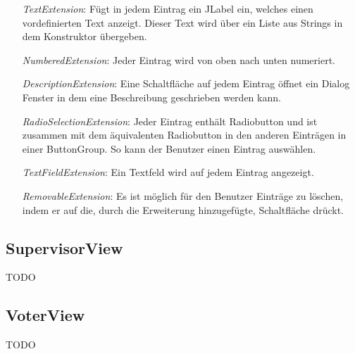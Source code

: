 \documentclass[parskip=full]{scrartcl}
\begin{document}
		\begin{itemize}
			\item[\textit{TextExtension}:] Fügt in jedem Eintrag ein JLabel ein, welches einen vordefinierten Text anzeigt. Dieser Text wird über ein Liste aus Strings in dem Konstruktor übergeben.
			\item[\textit{NumberedExtension}:] Jeder Eintrag wird von oben nach unten numeriert.
			\item[\textit{DescriptionExtension}:] Eine Schaltfläche auf jedem Eintrag öffnet ein Dialog Fenster in dem eine Beschreibung geschrieben werden kann.
			\item[\textit{RadioSelectionExtension}:] Jeder Eintrag enthält Radiobutton und ist zusammen mit dem äquivalenten Radiobutton in den anderen Einträgen in einer ButtonGroup. So kann der Benutzer einen Eintrag auswählen.
			\item[\textit{TextFieldExtension}:] Ein Textfeld wird auf jedem Eintrag angezeigt.
			\item[\textit{RemovableExtension}:] Es ist möglich für den Benutzer Einträge zu löschen, indem er auf die, durch die Erweiterung hinzugefügte, Schaltfläche drückt.
		\end{itemize}
	
		\subsection{SupervisorView}
		TODO
		
		\subsection{VoterView}
		TODO
	
	\newpage
	
\end{document}
